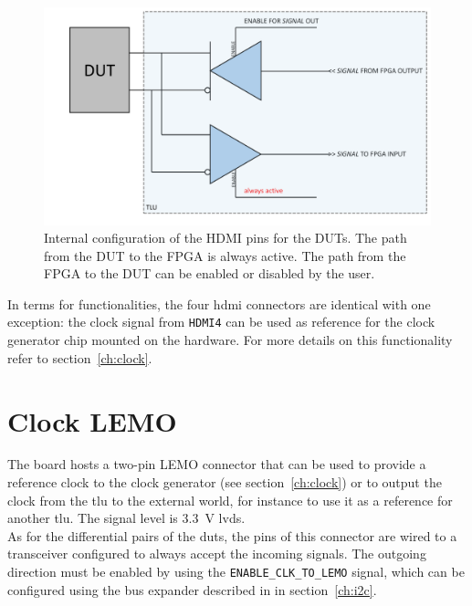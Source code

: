 \begin{figure}
  \centering
  \includegraphics[width=.80\textwidth]{./Images/LVDS_transceiver.pdf}
  \caption{Internal configuration of the HDMI pins for the DUTs. The path from the DUT to the FPGA is always active. The path from the FPGA to the DUT can be enabled or disabled by the user.}\label{fig:LVDSTransceiver}
\end{figure}
In terms for functionalities, the four \gls{hdmi} connectors are identical with one exception: the clock signal from \verb|HDMI4| can be used as reference for the clock generator chip mounted on the hardware. For more details on this functionality refer to section~\ref{ch:clock}.

\section{Clock LEMO}
The board hosts a two-pin LEMO connector that can be used to provide a reference clock to the clock generator (see section~\ref{ch:clock}) or to output the clock from the \gls{tlu} to the external world, for instance to use it as a reference for another \gls{tlu}. The signal level is 3.3~V \gls{lvds}.\\
As for the differential pairs of the \gls{dut}s, the pins of this connector are wired to a transceiver configured to always accept the incoming signals. The outgoing direction must be enabled by using the \verb|ENABLE_CLK_TO_LEMO| signal, which can be configured using the bus expander described in in section~\ref{ch:i2c}.

